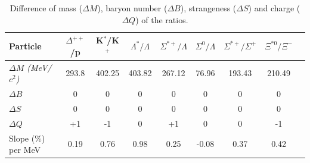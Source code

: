 \vspace{6pt}
 \begin{center}
\begin{table}[!htb] 
\caption{\label{diff} Difference of mass ($\Delta M$), baryon number ($\Delta B$), strangeness ($\Delta S$) and charge ($\Delta Q$) of the ratios.}
\centering
 \begin{tabular}{lcccccccc}
 	 		\hline
\hline
Particle&$\Delta^{++}$/p & K$^{*}$/K$^{+}$& $\Lambda^{*}/\Lambda$&$\Sigma^{*+}/\Lambda$  &$\Sigma^{0}/\Lambda$ & $\Sigma^{*+}/\Sigma^{+}$ & $\Xi^{*0}/\Xi^{-}$\\
\hline
\textit{$\Delta M$ ({\rm MeV}/$c^{2}$)}&293.8&402.25&403.82&267.12 &76.96&193.43&210.49\\
\textit{$\Delta B$}&0&0&0&0&0&0&0\\
\textit{$\Delta S$}&0&0&0&0&0&0&0\\
\textit{$\Delta Q$}&+1&-1&0&+1&0&0&-1\\
\hline
Slope (\%) per MeV & 0.19 &0.76& 0.98& 0.25& -0.08 &0.37 &0.42\\
 \hline
\end{tabular}
\end{table}
\end{center}


\newpage
